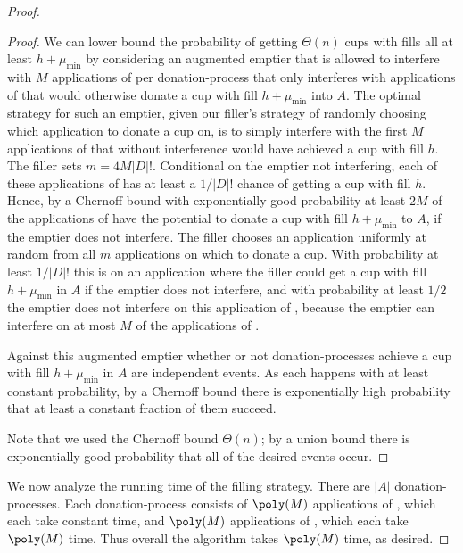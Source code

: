 \begin{proof}
\begin{proof}
  We can lower bound the probability of getting $\Theta(n)$ cups
  with fills all at least $h + \mu_{\min}$ by considering an augmented emptier
  that is allowed to interfere with $M$ applications of \randalg
  per donation-process that only interferes with applications of
  \randalg that would otherwise donate a cup with fill $h +
  \mu_{\min}$ into $A$. 
  The optimal strategy for such an emptier, given our filler's
  strategy of randomly choosing which application to donate a cup
  on, is to simply interfere with the first $M$ applications of
  \randalg that without interference would have achieved a cup
  with fill $h$. The filler sets $m = 4M|D|!$. Conditional on
  the emptier not interfering, each of these applications of
  \randalg has at least a $1/|D|!$ chance of getting a cup with
  fill $h$. Hence, by a Chernoff bound with exponentially good
  probability at least $2M$ of the applications of \randalg have
  the potential to donate a cup with fill $h+\mu_{\min}$ to $A$, if the
  emptier does not interfere. The filler chooses an application
  uniformly at random from all $m$ applications on which to
  donate a cup. With probability at least $1/|D|!$ this is on an
  application where the filler could get a cup with fill
  $h+\mu_{\min}$ in
  $A$ if the emptier does not interfere, and with probability at
  least $1/2$ the emptier does not interfere on this application
  of \randalg, because the emptier can interfere on at most $M$
  of the applications of \randalg. 

  Against this augmented emptier whether or not 
  donation-processes achieve a cup with fill $h+\mu_{\min}$ in $A$ are
  independent events. As each happens with at least constant
  probability, by a Chernoff bound there is exponentially high
  probability that at least a constant fraction of them succeed.

  Note that we used the Chernoff bound $\Theta(n)$; by a union
  bound there is exponentially good probability that all of the
  desired events occur.

\end{proof}

We now analyze the running time of the filling strategy.
There are $|A|$ donation-processes. Each donation-process
consists of $\poly(M)$ applications of \randalg, which each take
constant time, and $\poly(M)$
applications of \flatalg, which each take $\poly(M)$ time.
Thus overall the algorithm takes $\poly(M)$ time, as desired.
  
\end{proof}

